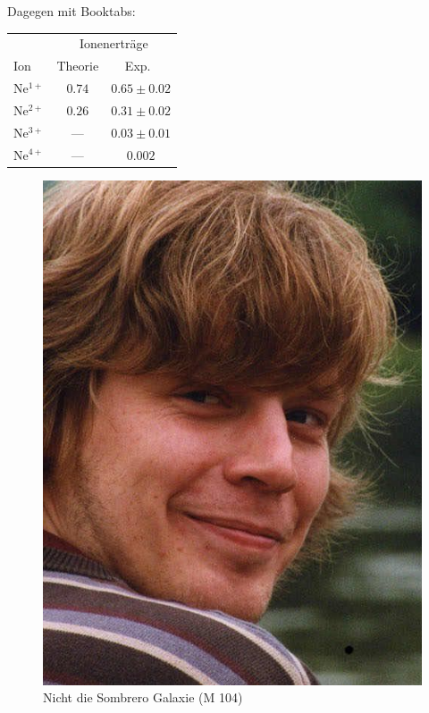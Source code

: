 \documentclass[a4paper, 10pt,onecolumn, captions=tableheading]{scrartcl}
\begin{document}
Dagegen mit Booktabs: 

\begin{center}
\begin{tabular}{lcc} \toprule & \multicolumn{2}{c}{Ionenerträge} \\ \cmidrule{2-3} Ion & Theorie & Exp.~\cite{Mor97} \\ \midrule Ne$^{1+}$ & $0.74$ & $0.65\pm0.02$ \\ Ne$^{2+}$ & $0.26$ & $0.31\pm0.02$ \\ Ne$^{3+}$ & --- & $0.03\pm0.01$ \\ Ne$^{4+}$ & --- & $0.002$ \\ \bottomrule \end{tabular}
\end{center}


\begin{figure}
\centering
\includegraphics[scale=0.25]{tauti.jpg}
\caption{Nicht die Sombrero Galaxie (M 104)}
\end{figure}
\end{document}
